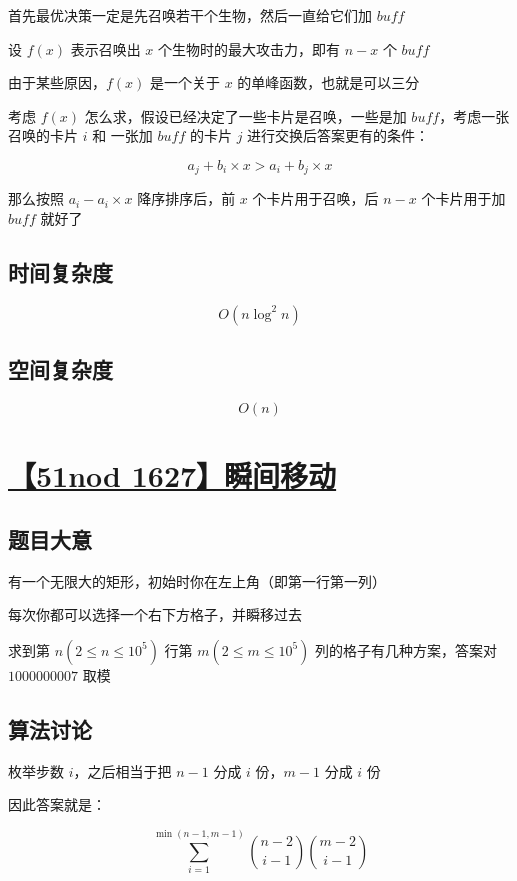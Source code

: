 \documentclass[UTF8]{article}
\begin{document}
首先最优决策一定是先召唤若干个生物，然后一直给它们加 $buff$

设 $f(x)$ 表示召唤出 $x$ 个生物时的最大攻击力，即有 $n-x$ 个 $buff$

由于某些原因，$f(x)$ 是一个关于 $x$ 的单峰函数，也就是可以三分

考虑 $f(x)$ 怎么求，假设已经决定了一些卡片是召唤，一些是加 $buff$，考虑一张召唤的卡片 $i$ 和 一张加 $buff$ 的卡片 $j$ 进行交换后答案更有的条件：

$$
a_j + b_i \times x > a_i + b_j \times x
$$

那么按照 $a_i-a_i \times x$ 降序排序后，前 $x$ 个卡片用于召唤，后 $n-x$ 个卡片用于加 $buff$ 就好了

\subsection{时间复杂度}

$$
O(n \log^2 n)
$$

\subsection{空间复杂度}

$$
O(n)
$$

\section{\href{https://www.51nod.com/Challenge/Problem.html?problemId=1627}{【51nod 1627】瞬间移动}}

\subsection{题目大意}

有一个无限大的矩形，初始时你在左上角（即第一行第一列）

每次你都可以选择一个右下方格子，并瞬移过去

求到第 $n(2 \le n \le 10^5)$ 行第 $m(2 \le m \le 10^5)$ 列的格子有几种方案，答案对 $1000000007$ 取模

\subsection{算法讨论}

枚举步数 $i$，之后相当于把 $n-1$ 分成 $i$ 份，$m-1$ 分成 $i$ 份

因此答案就是：

$$
\sum_{i=1}^{\min(n-1,m-1)} {n-2 \choose i-1} {m-2 \choose i-1}
$$
\end{document}
